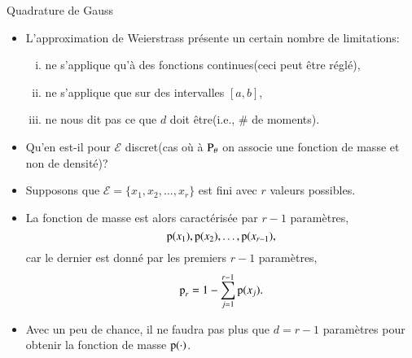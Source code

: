 \begin{frame}
    [allowframebreaks]{Quadrature de Gauss}
    \begin{itemize}
        \item L'approximation de Weierstrass présente un certain nombre de limitations: \begin{enumerate}[i)]
            \item ne s'applique qu'à des fonctions continues(ceci peut être réglé),
            \item ne s'applique que sur des intervalles $[a,b]$,
            \item ne nous dit pas ce que $d$ doit être(i.e., $\#$ de moments).
        \end{enumerate}
        \item Qu'en est-il pour $\mathcal{E}$ discret(cas où à $\operatorname{P}_\theta$ on 
        associe une fonction de masse et non de densité)?
        \framebreak
        \item Supposons que $\mathcal{E} = \{x_1, x_2, \ldots, x_r\}$ est fini avec $r$ valeurs possibles.
        \item La fonction de masse est alors caractérisée par $r-1$ paramètres,
        \[
        \operatorname{p}(x_1), \operatorname{p}(x_2), \ldots, \operatorname{p}(x_{r-1}),
        \]
        car le dernier est donné par les premiers $r-1$ paramètres,
        \[
        \operatorname{p}_r = 1-\sum_{j=1}^{r-1}\operatorname{p}(x_j).
        \]
        \item Avec un peu de chance, il ne faudra pas plus que $d=r-1$
         paramètres pour obtenir la fonction de masse $\operatorname{p}(\cdot)$.


\end{itemize}
\end{frame}
